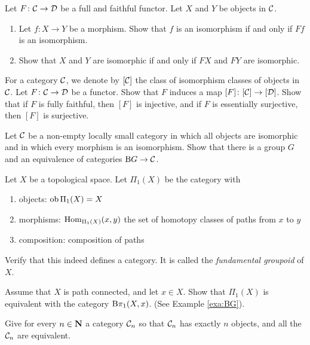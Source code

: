 \begin{exercise}\label{exc:fully-faithful-isomorphism}
Let $F\colon {\mathcal{C}} \to {\mathcal{D}}$ be a full and faithful functor. Let $X$ and $Y$ be objects in ${\mathcal{C}}$. 
\begin{enumerate}
\item Let $f \colon X\to Y$ be a morphism. Show that $f$ is an isomorphism if and only if $Ff$ is an isomorphism.
\item Show that $X$ and $Y$ are isomorphic if and only if $FX$ and $FY$ are isomorphic.
\end{enumerate}
\end{exercise}

\begin{exercise}
For a category ${\mathcal{C}}$, we denote by $[{\mathcal{C}}]$ the class of isomorphism classes of objects in ${\mathcal{C}}$. 
Let $F\colon {\mathcal{C}} \to {\mathcal{D}}$ be a functor. Show that $F$ induces a map $[F]\colon [{\mathcal{C}}] \to [{\mathcal{D}}]$. Show that if $F$ is fully faithful, then $[F]$ is injective, and if $F$ is essentially surjective, then $[F]$ is surjective.
\end{exercise}

\begin{exercise}
Let ${\mathcal{C}}$ be a non-empty locally small category in which all objects are isomorphic and in which every morphism is an isomorphism. Show that there is a group $G$ and an equivalence of categories ${\mathrm B} G \to {\mathcal{C}}$.
\end{exercise}


\begin{exercise}
Let $X$ be a topological space. Let $\Pi_1(X)$  be the category with
\begin{enumerate}
\item objects: $\operatorname{ob} \Pi_1(X) = X$ 
\item morphisms: $\operatorname{Hom}_{\Pi_1(X)}(x,y)$ the set of homotopy classes of paths from $x$ to $y$
\item composition: composition of paths
\end{enumerate}
Verify that this indeed defines a category. It is called the \emph{fundamental groupoid} of $X$.

Assume that $X$ is path connected, and let $x\in X$. Show that $\Pi_1(X)$ is equivalent with the category ${\mathrm B} \pi_1(X,x)$. (See Example \ref{exa:BG}).
\end{exercise}



\begin{exercise}
Give for every $n\in {\mathbf{N}}$ a category ${\mathcal{C}}_n$ so that ${\mathcal{C}}_n$ has exactly $n$ objects, and all the ${\mathcal{C}}_n$ are equivalent.
\end{exercise}


